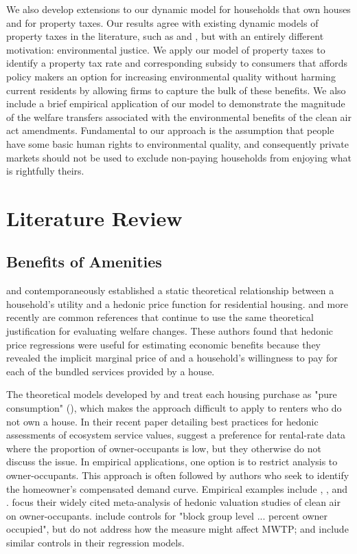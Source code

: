 \documentclass[ecta,nameyear,draft]{econsocart}
\theoremstyle{plain}
\theoremstyle{remark}
\begin{document}
We also develop extensions to our dynamic model for households that own houses and for property taxes. Our results agree with existing dynamic models of property taxes in the literature, such as \cite{freeman80} and \cite{poterba84}, but with an entirely different motivation: environmental justice. We apply our model of property taxes to identify a  property tax rate and corresponding subsidy to consumers that affords policy makers an option for increasing environmental quality without harming current residents by allowing firms to capture the bulk of these benefits. We also include a brief empirical application of our model to demonstrate the magnitude of the welfare transfers associated with the environmental benefits of the clean air act amendments. Fundamental to our approach is the assumption that people have some basic human rights to environmental quality, and consequently private markets should not be used to exclude non-paying households from enjoying what is rightfully theirs.


\section{Literature Review}

\subsection{Benefits of Amenities}

\cite{rosen74} and \cite{freeman74} contemporaneously established a static theoretical relationship between a household's utility and a hedonic price function for residential housing. \cite{freeman99} and more recently \cite{freeman14} are common references that continue to use the same theoretical justification for evaluating welfare changes. These authors found that hedonic price regressions were useful for estimating economic benefits because they revealed the implicit marginal price of and a household's willingness to pay for each of the bundled services provided by a house. 

The theoretical models developed by \cite{rosen74} and \cite{freeman74} treat each housing purchase as "pure consumption" (\cite{rosen74}), which makes the approach difficult to apply to renters who do not own a house. In their recent paper detailing best practices for hedonic assessments of ecosystem service values, \cite{bishop20} suggest a preference for rental-rate data where the proportion of owner-occupants is low, but they otherwise do not discuss the issue. In empirical applications, one option is to restrict analysis to owner-occupants. This approach is often followed by authors who seek to identify the homeowner's compensated demand curve. Empirical examples include \cite{palmquist84}, \cite{zabelkiel00}, and \cite{chaygreenstone05}. \cite{smithhuang95} focus their widely cited meta-analysis of hedonic valuation studies of clean air on owner-occupants. \cite{kuminoffpope14} include controls for "block group level ... percent owner occupied", but do not address how the measure might affect MWTP; \cite{chaygreenstone05} and \cite{bento15} include similar controls in their regression models.
 
\end{document}
